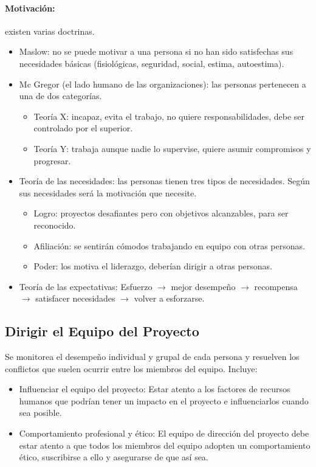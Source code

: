 \documentclass[a4paper,twosides]{article}
\newlength{\wideitemsep}
\let\olditem\item
\renewcommand{\item}{\setlength{\itemsep}{\wideitemsep}\olditem}
\begin{document}
\paragraph{Motivación:} existen varias doctrinas.
\begin{itemize}
\item Maslow: no se puede motivar a una persona si no han sido satisfechas sus necesidades básicas (fisiológicas, seguridad, social, estima, autoestima).
\item Mc Gregor (el lado humano de las organizaciones): las personas pertenecen a una de dos categorías.
\begin{itemize}
\item Teoría X: incapaz, evita el trabajo, no quiere responsabilidades, debe ser controlado por el superior.
\item Teoría Y: trabaja aunque nadie lo supervise, quiere asumir compromisos y progresar.
\end{itemize}
\item Teoría de las necesidades: las personas tienen tres tipos de necesidades. Según sus necesidades será la motivación que necesite.
\begin{itemize}
\item Logro: proyectos desafiantes pero con objetivos alcanzables, para ser reconocido.
\item Afiliación: se sentirán cómodos trabajando en equipo con otras personas.
\item Poder: los motiva el liderazgo, deberían dirigir a otras personas.
\end{itemize}
\item Teoría de las expectativas: Esfuerzo $\rightarrow$ mejor desempeño $\rightarrow$ recompensa $\rightarrow$ satisfacer necesidades $\rightarrow$ volver a esforzarse.
\end{itemize}

\subsection{Dirigir el Equipo del Proyecto}
\label{sec:dirigir_equipo}
Se monitorea el desempeño individual y grupal de cada persona y resuelven los conflictos que suelen ocurrir entre los miembros del equipo. Incluye:
\begin{itemize}
\item Influenciar el equipo del proyecto: Estar atento a los factores de recursos humanos que podrían tener un impacto en el proyecto e influenciarlos cuando sea posible.
\item Comportamiento profesional y ético: El equipo de dirección del proyecto debe estar atento a que todos los miembros del equipo adopten un comportamiento ético, suscribirse a ello y asegurarse de que así sea.
\end{itemize}
\end{document}
